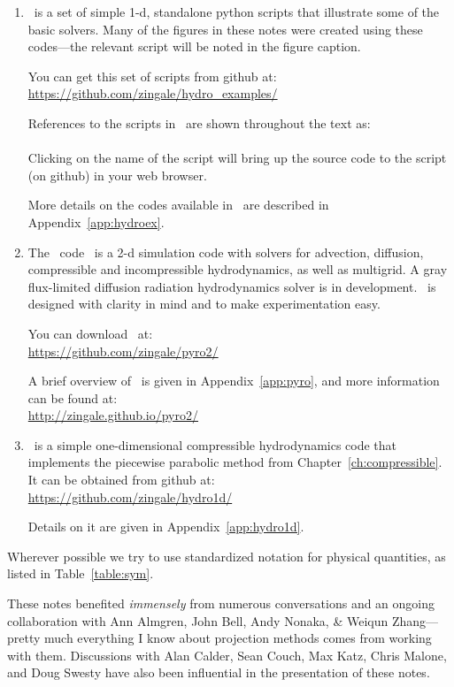 \begin{enumerate}
\item \hydroex\ is a set of simple 1-d, standalone python scripts
  that illustrate some of the basic solvers.  Many of the figures
  in these notes were created using these codes---the relevant
  script will be noted in the figure caption.

  You can get this set of scripts from github at:\\
  \url{https://github.com/zingale/hydro_examples/}

  References to the scripts in \hydroex\ are shown throughout
  the text as: \\[0.5em]
   \\[0.5em]
  Clicking on the name of the script will bring up the source code
  to the script (on github) in your web browser.

  More details on the codes available in \hydroex\ are described
  in Appendix~\ref{app:hydroex}.

\item
  The \pyro\ code~\cite{pyro} is a 2-d simulation code with
  solvers for advection, diffusion, compressible and incompressible
  hydrodynamics, as well as multigrid.  A gray flux-limited diffusion
  radiation hydrodynamics solver is
  in development.  \pyro\ is designed with clarity in mind and to make
  experimentation easy.

  You can download \pyro\ at: \\
  \url{https://github.com/zingale/pyro2/}

  A brief overview of \pyro\ is given in Appendix~\ref{app:pyro},
  and more information can be found at: \\
\url{http://zingale.github.io/pyro2/}

\item \hydrooned\ is a simple one-dimensional compressible
  hydrodynamics code that implements the piecewise parabolic method
  from Chapter~\ref{ch:compressible}.  It can be obtained from
  github at:\\
  \url{https://github.com/zingale/hydro1d/}

  Details on it are given in
  Appendix~\ref{app:hydro1d}.
\end{enumerate}

Wherever possible we try to use standardized notation for physical
quantities, as listed in Table~\ref{table:sym}.

These notes benefited {\em immensely} from numerous conversations and
an ongoing collaboration with Ann Almgren, John Bell, Andy Nonaka, \&
Weiqun Zhang---pretty much everything I know about projection methods
comes from working with them.  Discussions with Alan Calder, Sean
Couch, Max Katz, Chris Malone, and Doug Swesty have also been
influential in the presentation of these notes.

